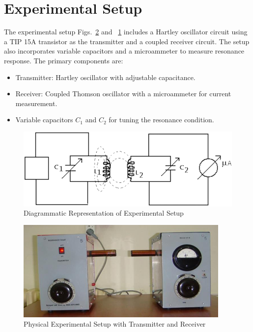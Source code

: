 \documentclass[journal]{IEEEtran}
\begin{document}
\section{Experimental Setup}
The experimental setup Figs.~\ref{fig:exp_setup} and ~\ref{fig:exp_diagram} includes a Hartley oscillator circuit using a TIP 15A transistor as the transmitter and a coupled receiver circuit. The setup also incorporates variable capacitors and a microammeter to measure resonance response. The primary components are:
\begin{itemize}
    \item Transmitter: Hartley oscillator with adjustable capacitance.
    \item Receiver: Coupled Thomson oscillator with a microammeter for current measurement.
    \item Variable capacitors \( C_1 \) and \( C_2 \) for tuning the resonance condition.
\end{itemize}

\begin{figure}[H]
    \centering
    \includegraphics[width=0.8\linewidth]{IMAGES/Experimental_diagram.png}
    \caption{Diagrammatic Representation of Experimental Setup}
    \label{fig:exp_diagram}
\end{figure}

\begin{figure}[H]
    \centering
    \includegraphics[width=0.8\linewidth]{IMAGES/Experimental_setup.png}
    \caption{Physical Experimental Setup with Transmitter and Receiver}
    \label{fig:exp_setup}
\end{figure}
\end{document}

